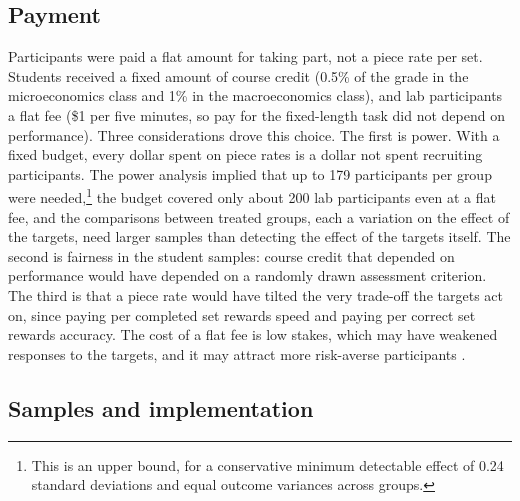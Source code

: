 \documentclass[12pt, letterpaper]{article}
\begin{document}
\subsection{Payment}

Participants were paid a flat amount for taking part, not a piece rate per set. Students received a fixed amount of course credit (0.5\% of the grade in the microeconomics class and 1\% in the macroeconomics class), and lab participants a flat fee (\$1 per five minutes, so pay for the fixed-length task did not depend on performance). Three considerations drove this choice. The first is power. With a fixed budget, every dollar spent on piece rates is a dollar not spent recruiting participants. The power analysis implied that up to 179 participants per group were needed,\footnote{This is an upper bound, for a conservative minimum detectable effect of 0.24 standard deviations and equal outcome variances across groups.} the budget covered only about 200 lab participants even at a flat fee, and the comparisons between treated groups, each a variation on the effect of the targets, need larger samples than detecting the effect of the targets itself. The second is fairness in the student samples: course credit that depended on performance would have depended on a randomly drawn assessment criterion. The third is that a piece rate would have tilted the very trade-off the targets act on, since paying per completed set rewards speed and paying per correct set rewards accuracy. The cost of a flat fee is low stakes, which may have weakened responses to the targets, and it may attract more risk-averse participants \parencite{harrison.2009.riskattitudes}.

\subsection{Samples and implementation}
\end{document}

